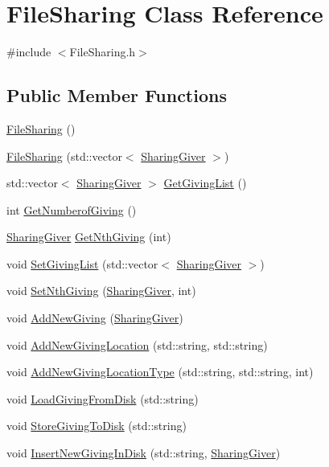 \hypertarget{classFileSharing}{\section{File\-Sharing Class Reference}
\label{classFileSharing}
}


{\ttfamily \#include $<$File\-Sharing.\-h$>$}

\subsection*{Public Member Functions}
\begin{DoxyCompactItemize}
\item 
\hyperlink{classFileSharing_a539ef2e0e59c0ddd0715ccd1e16f63d2}{File\-Sharing} ()
\item 
\hyperlink{classFileSharing_a55c1c57dafa18b79639867e147021147}{File\-Sharing} (std\-::vector$<$ \hyperlink{structSharingGiver}{Sharing\-Giver} $>$)
\item 
std\-::vector$<$ \hyperlink{structSharingGiver}{Sharing\-Giver} $>$ \hyperlink{classFileSharing_a9da34b4ac5ca83b106cc2aaffe4af6fa}{Get\-Giving\-List} ()
\item 
int \hyperlink{classFileSharing_aab67e7776c12d4042964e48c8f25db8e}{Get\-Numberof\-Giving} ()
\item 
\hyperlink{structSharingGiver}{Sharing\-Giver} \hyperlink{classFileSharing_ab6f49719723253db4059cdb6cec4f349}{Get\-Nth\-Giving} (int)
\item 
void \hyperlink{classFileSharing_af1e6745b3a99e246a5ee024cd9c92552}{Set\-Giving\-List} (std\-::vector$<$ \hyperlink{structSharingGiver}{Sharing\-Giver} $>$)
\item 
void \hyperlink{classFileSharing_afc6e91c21d2dafc4fc14b5572056aef7}{Set\-Nth\-Giving} (\hyperlink{structSharingGiver}{Sharing\-Giver}, int)
\item 
void \hyperlink{classFileSharing_a85b729bbd96acfb03a60013253960bc5}{Add\-New\-Giving} (\hyperlink{structSharingGiver}{Sharing\-Giver})
\item 
void \hyperlink{classFileSharing_a2686a37bf651039a8ff8dd628df05566}{Add\-New\-Giving\-Location} (std\-::string, std\-::string)
\item 
void \hyperlink{classFileSharing_a0263cdeec0b7e5091c1be75b07d23e00}{Add\-New\-Giving\-Location\-Type} (std\-::string, std\-::string, int)
\item 
void \hyperlink{classFileSharing_a958b4d59097fc63b5618b40883d67cf0}{Load\-Giving\-From\-Disk} (std\-::string)
\item 
void \hyperlink{classFileSharing_a952c1a0b21ad0435ed4ef265ba673449}{Store\-Giving\-To\-Disk} (std\-::string)
\item 
void \hyperlink{classFileSharing_afa1b4bfb32955ba83e633b64fbae921e}{Insert\-New\-Giving\-In\-Disk} (std\-::string, \hyperlink{structSharingGiver}{Sharing\-Giver})
\end{DoxyCompactItemize}
